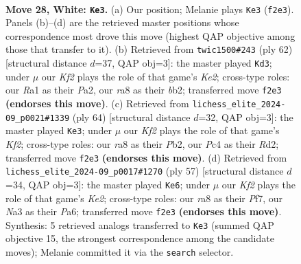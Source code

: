 \documentclass[11pt]{article}
\begin{document}
\clearpage

\begin{figure}[p]\centering
\begin{subfigure}{0.46\textwidth}\centering
\resizebox{\linewidth}{!}{%
\newchessgame
\chessboard[
  setfen={r7/pbpp2k1/1p3n1p/5p2/2P2P2/NP6/P2PBK1P/R7 w - - 1 28},
  showmover=false,
  pgfstyle=straightmove, color=movearrow, markmove={f2-e3}
]}
\caption{}
\end{subfigure}\hfill
\begin{subfigure}{0.46\textwidth}\centering
\resizebox{\linewidth}{!}{%
\newchessgame
\chessboard[
  setfen={8/3n1pk1/ppNBp1pp/8/1PP5/6P1/Pb2KP1P/8 w - - 1 32},
  showmover=false,
  pgfstyle=straightmove, color=movearrow, markmove={e2-d3}
]}
\caption{}
\end{subfigure}
\\[4pt]
\begin{subfigure}{0.46\textwidth}\centering
\resizebox{\linewidth}{!}{%
\newchessgame
\chessboard[
  setfen={r7/1p2kppp/2b1p3/p7/2P2P2/6P1/PP1RBK1P/8 w - - 0 33},
  showmover=false,
  pgfstyle=straightmove, color=movearrow, markmove={f2-e3}
]}
\caption{}
\end{subfigure}\hfill
\begin{subfigure}{0.46\textwidth}\centering
\resizebox{\linewidth}{!}{%
\newchessgame
\chessboard[
  setfen={8/1p2kpp1/pn4p1/3p4/1b1P1BP1/1P3P2/P4K1P/3N4 b - - 4 29},
  showmover=false,
  pgfstyle=straightmove, color=movearrow, markmove={e7-e6}
]}
\caption{}
\end{subfigure}
\caption{\textbf{Move 28, White: \texttt{Ke3}.} (a) Our position; Melanie plays \texttt{Ke3} (\texttt{f2e3}). Panels (b)--(d) are the retrieved master positions whose correspondence most drove this move (highest QAP objective among those that transfer to it). (b) Retrieved from \texttt{twic1500\#243} (ply 62) [structural distance $d$=37, QAP obj=3]: the master played \texttt{Kd3}; under $\mu$ our \emph{Kf2} plays the role of that game's \emph{Ke2}; cross-type roles: our \emph{R}a1 as their \emph{P}a2, our \emph{r}a8 as their \emph{b}b2; transferred move \texttt{f2e3} \textbf{(endorses this move)}. (c) Retrieved from \texttt{lichess\_elite\_2024-09\_p0021\#1339} (ply 64) [structural distance $d$=32, QAP obj=3]: the master played \texttt{Ke3}; under $\mu$ our \emph{Kf2} plays the role of that game's \emph{Kf2}; cross-type roles: our \emph{r}a8 as their \emph{P}b2, our \emph{P}c4 as their \emph{R}d2; transferred move \texttt{f2e3} \textbf{(endorses this move)}. (d) Retrieved from \texttt{lichess\_elite\_2024-09\_p0017\#1270} (ply 57) [structural distance $d$=34, QAP obj=3]: the master played \texttt{Ke6}; under $\mu$ our \emph{Kf2} plays the role of that game's \emph{Ke2}; cross-type roles: our \emph{r}a8 as their \emph{P}f7, our \emph{N}a3 as their \emph{P}a6; transferred move \texttt{f2e3} \textbf{(endorses this move)}. Synthesis: 5 retrieved analogs transferred to \texttt{Ke3} (summed QAP objective 15, the strongest correspondence among the candidate moves); Melanie committed it via the \texttt{search} selector.}
\label{fig:thought-m54}
\end{figure}
\end{document}
